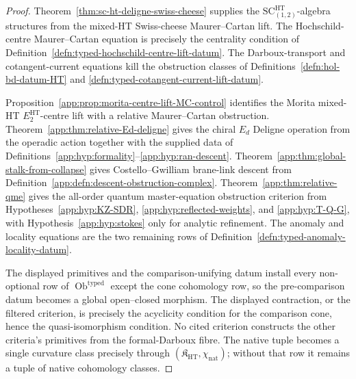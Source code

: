 \begin{proof}
Theorem~\ref{thm:sc-ht-deligne-swiss-cheese} supplies the
\(\mathrm{SC}^{\mathrm{HT}}_{(1,2)}\)-algebra structures from the
mixed-HT Swiss-cheese Maurer--Cartan lift.  The Hochschild-centre
Maurer--Cartan equation is precisely the centrality condition of
Definition~\ref{defn:typed-hochschild-centre-lift-datum}.  The
Darboux-transport and cotangent-current equations kill the obstruction
classes of Definitions~\ref{defn:hol-bd-datum-HT} and
\ref{defn:typed-cotangent-current-lift-datum}.

Proposition~\ref{app:prop:morita-centre-lift-MC-control} identifies the
Morita mixed-HT \(E_2^{\mathrm{HT}}\)-centre lift with a relative Maurer--Cartan
obstruction.  Theorem~\ref{app:thm:relative-Ed-deligne} gives the
chiral \(E_d\) Deligne operation from the operadic action together with
the supplied data of
Definitions~\ref{app:hyp:formality}--\ref{app:hyp:ran-descent}.
Theorem~\ref{app:thm:global-stalk-from-collapse} gives
Costello--Gwilliam brane-link descent from
Definition~\ref{app:defn:descent-obstruction-complex}.
Theorem~\ref{app:thm:relative-qme} gives the all-order quantum
master-equation obstruction criterion from
Hypotheses~\ref{app:hyp:KZ-SDR}, \ref{app:hyp:reflected-weights}, and
\ref{app:hyp:T-Q-G}, with Hypothesis~\ref{app:hyp:stokes} only for
analytic refinement.  The anomaly and locality equations are the two
remaining rows of Definition~\ref{defn:typed-anomaly-locality-datum}.

The displayed primitives and the comparison-unifying datum install every
non-optional row of \(\operatorname{Ob}^{\mathrm{typed}}\) except the cone
cohomology row, so the pre-comparison datum becomes a global open--closed
morphism.  The displayed contraction, or the filtered criterion, is
precisely the acyclicity condition for the comparison cone, hence the
quasi-isomorphism condition.  No cited criterion constructs the other
criteria's primitives from the formal-Darboux fibre.  The native tuple
becomes a single curvature class precisely through
\((\mathfrak K_{\mathrm{HT}},\chi_{\mathrm{nat}})\); without that row it
remains a tuple of native cohomology classes.
\end{proof}

